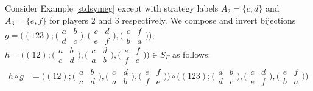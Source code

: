    	\begin{example}
   		Consider Example \ref{stdsymeg} except with strategy labels $A_2 =\{c, d\}$ and $A_3 = \{e, f\}$ for players $2$ and $3$ respectively. We compose and invert bijections $g = \bigl((123) ; \bigl(\begin{smallmatrix} a & b \\ d & c \end{smallmatrix}\bigr), \bigl(\begin{smallmatrix} c & d \\ e & f \end{smallmatrix}\bigr), \bigl(\begin{smallmatrix} e & f \\ b & a \end{smallmatrix}\bigr)\bigr)$, $h = \bigl((12) ; \bigl(\begin{smallmatrix} a & b \\ c & d \end{smallmatrix}\bigr), \bigl(\begin{smallmatrix} c & d \\ a & b \end{smallmatrix}\bigr), \bigl(\begin{smallmatrix} e & f \\ f & e \end{smallmatrix}\bigr)\bigr) \in S_{\Gamma}$ as follows:
   		\begin{align*}
   			h \circ g &= \bigl((12) ; \bigl(\begin{smallmatrix} a & b \\ c & d \end{smallmatrix}\bigr), \bigl(\begin{smallmatrix} c & d \\ a & b \end{smallmatrix}\bigr), \bigl(\begin{smallmatrix} e & f \\ f & e \end{smallmatrix}\bigr)\bigr) \circ \bigl((123) ; \bigl(\begin{smallmatrix} a & b \\ d & c \end{smallmatrix}\bigr), \bigl(\begin{smallmatrix} c & d \\ e & f \end{smallmatrix}\bigr), \bigl(\begin{smallmatrix} e & f \\ b & a \end{smallmatrix}\bigr)\bigr) \\

\end{align*}
\end{example}
